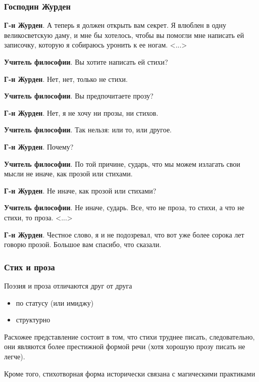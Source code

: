 \documentclass{beamer}
\begin{document}
\begin{frame}
\frametitle{Господин Журден}

\textbf{Г-н Журден}. А теперь я должен открыть вам секрет. Я влюблен в одну великосветскую даму, и мне бы хотелось, чтобы вы помогли мне написать ей записочку, которую я собираюсь уронить к ее ногам. <...>

\textbf{Учитель философии}.  Вы хотите написать ей стихи?

\textbf{Г-н Журден}. Нет, нет, только не стихи.

\textbf{Учитель философии}. Вы предпочитаете прозу?

\textbf{Г-н Журден}. Нет, я не хочу ни прозы, ни стихов.

\textbf{Учитель философии}. Так нельзя: или то, или другое.

\textbf{Г-н Журден}. Почему?

\textbf{Учитель философии}. По той причине, сударь, что мы можем излагать свои мысли не иначе, как прозой или стихами.

\textbf{Г-н Журден}. Не иначе, как прозой или стихами?

\textbf{Учитель философии}. Не иначе, сударь. Все, что не проза, то стихи, а что не стихи, то проза.
<...>

\textbf{Г-н Журден}. Честное слово, я и не подозревал, что вот уже более сорока лет говорю прозой. Большое вам спасибо, что сказали.

\end{frame}


\begin{frame}
\frametitle{Стих и проза}
Поэзия и проза отличаются друг от друга

\begin{itemize}
\item по статусу (или имиджу)
\item структурно
\end{itemize}

Расхожее представление состоит в том, что стихи труднее писать, следовательно, они являются более престижной формой речи (хотя хорошую прозу писать не легче).

Кроме того, стихотворная форма исторически связана с магическими практиками

\end{frame}

\end{document}
